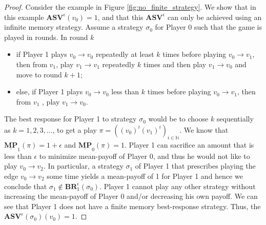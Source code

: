 \begin{proof}
Consider the example in Figure \ref{fig:no_finite_strategy}. We show that in this example $\mathbf{ASV}^{\epsilon}(v_0) = 1$, and that this $\mathbf{ASV}^{\epsilon}$ can only be achieved using an infinite memory strategy. Assume a strategy $\sigma_0$ for Player 0
such that the game is played in rounds.
In round $k$
\begin{itemize}[-]
    \item if Player 1 plays $v_0 \to v_0$ repeatedly at least $k$ times before playing $v_0 \to v_1$, then from $v_1$, play $v_1 \to v_1$ repeatedly $k$ times and then play $v_1 \to v_0$ and 
    move to round $k+1$;
    \item else, if Player 1 plays $v_0 \to v_0$ less than $k$ times before playing $v_0 \to v_1$, then from $v_1$ , play $v_1 \to v_0$.
\end{itemize}


The best response for Player 1 to strategy $\sigma_0$ would be to choose $k$ sequentially as $k = 1, 2, 3, \dotsc$, to get a play $\pi = ((v_0)^i(v_1)^i)_{i \in \mathbb{N}}$. We know that $\underline{\mathbf{MP}}_1(\pi) = 1+\epsilon$ and $\underline{\mathbf{MP}}_0(\pi) = 1$. Player 1 can sacrifice an amount that is less than $\epsilon$ to minimize mean-payoff of Player 0, and thus he would not like to play $v_0 \to v_2$. In particular, a strategy $\sigma_1$ of Player 1 that prescribes playing the edge $v_0 \to v_2$ some time 
yields a mean-payoff of 1 for Player 1 and hence we conclude that $\sigma_1 \notin \mathbf{BR}_1^{\epsilon}(\sigma_0)$. Player 1 cannot play any other strategy without increasing the mean-payoff of Player 0 and/or decreasing his own payoff.
We can see that Player 1 does not have a finite memory best-response strategy. Thus, the $\mathbf{ASV}^{\epsilon}(\sigma_0)(v_0) = 1$.



\end{proof}
